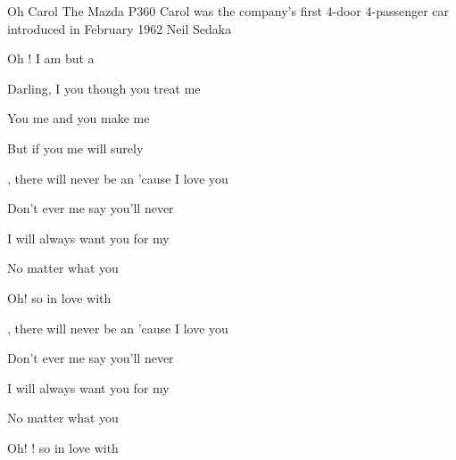 \begin{SBSong}{Oh Carol}
  {The Mazda P360 Carol was the company's first 4-door 4-passenger car introduced in February 1962}
  {Neil Sedaka}
  \begin{SBVerse}
	Oh ! I am but a 
	
	Darling, I  you though you treat me 
	
	You  me and you make me 
	
	But if you  me  will surely  
  \end{SBVerse}
  \begin{SBVerse}
	, there will never be an 'cause I love you 
	
	Don't ever  me say you'll never 

	I will always want you for my 
	
	No matter what you 
	
	Oh!  so in love with  
  \end{SBVerse}
  \begin{SBVerse}
	, there will never be an 'cause I love you 
	
	Don't ever  me say you'll never 

	I will always want you for my 
	
	No matter what you 
	
	Oh! !  so in love with   
  \end{SBVerse}
\end{SBSong}
